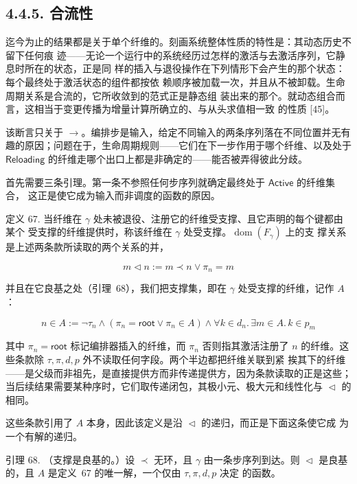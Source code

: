 \subsection{4.4.5. 合流性}\label{confluence}

迄今为止的结果都是关于单个纤维的。刻画系统整体性质的特性是：其动态历史不留下任何痕
迹——无论一个运行中的系统经历过怎样的激活与去激活序列，它静息时所在的状态，正是同
样的插入与退役操作在下列情形下会产生的那个状态：每个最终处于激活状态的组件都按依
赖顺序被加载一次，并且从不被卸载。生命周期关系是合流的，它所收敛到的范式正是静态组
装出来的那个。就动态组合而言，这相当于变更传播为增量计算所确立的、与从头求值相一致
的性质 {[}45{]}。

该断言只关于 \(\longrightarrow\)。编排步是输入，给定不同输入的两条序列落在不同位置并无有
趣的原因；问题在于，生命周期规则——它们在下一步作用于哪个纤维、以及处于
\(\mathsf{Reloading}\) 的纤维走哪个出口上都是非确定的——能否被弄得彼此分歧。

首先需要三条引理。第一条不参照任何步序列就确定最终处于 \(\mathsf{Active}\) 的纤维集合，
这正是使它成为输入而非调度的函数的原因。

定义 67. 当纤维在 \(\gamma\) 处未被退役、注册它的纤维受支撑、且它声明的每个键都由某个
受支撑的纤维提供时，称该纤维在 \(\gamma\) 处受支撑。\(\operatorname{dom}(F_{\gamma})\) 上的支
撑关系是上述两条款所读取的两个关系的并，

\[
m \vartriangleleft n := m \prec n \vee \pi_{n} = m \tag{62}
\]

并且在它良基之处（引理~68），我们把支撑集，即在 \(\gamma\) 处受支撑的纤维，记作 \(A\)：

\[
n \in A := \lnot \tau_{n} \land (\pi_{n} = \mathsf{root} \lor \pi_{n} \in A) \land \forall k \in d_{n}.\, \exists m \in A.\, k \in p_{m} \tag{63}
\]

其中 \(\pi_{n} = \mathsf{root}\) 标记编排器插入的纤维，而 \(\pi_{n}\) 否则指其激活注册了
\(n\) 的纤维。这些条款除 \(\tau, \pi, d, p\) 外不读取任何字段。两个半边都把纤维关联到紧
挨其下的纤维——是父级而非祖先，是直接提供方而非传递提供方，因为条款读取的正是这些；
当后续结果需要某种序时，它们取传递闭包，其极小元、极大元和线性化与
\(\vartriangleleft\) 的相同。

这些条款引用了 \(A\) 本身，因此该定义是沿 \(\vartriangleleft\) 的递归，而正是下面这条使它成
为一个有解的递归。

引理 68. （支撑是良基的。）设 \(\prec\) 无环，且 \(\gamma\) 由一条步序列到达。则
\(\vartriangleleft\) 是良基的，且 \(A\) 是定义~67 的唯一解，一个仅由 \(\tau, \pi, d, p\) 决定
的函数。

